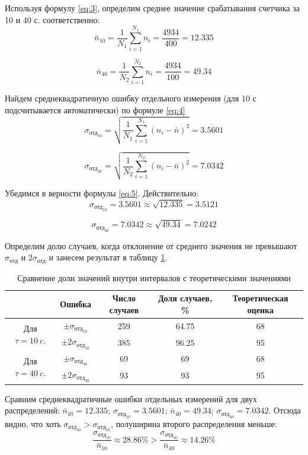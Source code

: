 \documentclass[a4paper, 12pt]{article}
\begin{document}
\begin{enumerate}
    Используя формулу \ref{eq:3}, определим среднее значение срабатывания счетчика за 10  и 40 с. соответственно:
\[
    \bar{n}_{10} = \frac{1}{N_1} \sum_{i=1}^{N_{1}} {n_i} = \frac{4934}{400} = 12.335
\]

\[
    \bar{n}_{40} = \frac{1}{N_2} \sum_{i=1}^{N_{2}} {n_i} = \frac{4934}{100} = 49.34
\]

 Найдем среднеквадратичную ошибку отдельного измерения (для 10 с подсчитывается автоматически) по формуле \eqref{eq:4}
\[
    \sigma_{отд_{10}} = \sqrt {\frac{1}{N_1} \sum_{i=1}^{N_{1}} ({n_i - \bar{n}})^2} = 3.5601
\]

\[
    \sigma_{отд_{40}} = \sqrt {\frac{1}{N_2} \sum_{i=1}^{N_{2}} ({n_i - \bar{n}})^2} = 7.0342
\]

 Убедимся в верности формулы \eqref{eq:5}. Действительно:
\[
    \sigma_{отд_{10}} = 3.5601 \approx \sqrt{12.335} = 3.5121
\]

\[
    \sigma_{отд_{40}} = 7.0342 \approx \sqrt{49.34} = 7.0242
\]

 Определим долю случаев, когда отклонение от среднего значения не превышают $\sigma_{отд}$ и $2\sigma_{отд}$ и занесем результат в таблицу \ref{tabl:percent_errors}.

\begin{table}[!h]
    \centering
    \begin{tabular}{|c|c|c|c|c|}
        \hline
         & Ошибка & Число случаев & Доля случаев, \% & Теоретическая оценка \\ \hline
        \multirow{2}{*}{Для $\tau = 10~c.$} & $\pm \sigma_{отд_{10}}$ & 259 & 64.75 & 68 \\ \cline{2-5}
        & $\pm 2 \sigma_{отд_{10}}$ & 385 & 96.25 & 95 \\ \hline
        \multirow{2}{*}{Для $\tau = 40~c.$} &$ \pm \sigma_{отд_{40}}$ & 69 & 69 & 68 \\ \cline{2-5}
        & $\pm 2 \sigma_{отд_{40}}$ & 93 & 93 & 95 \\ \hline
    \end{tabular}
    \caption{Сравнение доли значений внутри интервалов с теоретическими значениями}
    \label{tabl:percent_errors}
\end{table}

 Сравним среднеквадратичные ошибки отдельных измерений для двух распределений: $\bar{n}_{10} = 12.335$;  $\sigma_{отд_{10}} = 3.5601$;  $\bar{n}_{40} = 49.34$;  $\sigma_{отд_{40}} = 7.0342$. Отсюда видно, что хоть $\sigma_{отд_{40}} > \sigma_{отд_{10}}$, полуширина второго распределения меньше:
\[
    \frac{\sigma_{отд_{10}}}{\bar{n}_{10}} \approx 28.86\% > \frac{\sigma_{отд_{40}}}{\bar{n}_{40}} \approx 14.26\%
\]


\end{enumerate}
\end{document}
